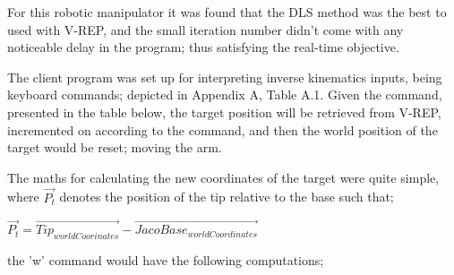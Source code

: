 \documentclass[12pt,openany,a4paper]{book}
\begin{document}
For this robotic manipulator it was found that the DLS method was the best to used with V-REP, and the small iteration number didn't come with any noticeable delay in the program; thus satisfying the real-time objective.

The client program was set up for interpreting inverse kinematics inputs, being keyboard commands; depicted in Appendix A, Table A.1. Given the command, presented in the table below, the target position will be retrieved from V-REP, incremented on according to the command, and then the world position of the target would be reset; moving the arm.

%

\vspace{\baselineskip}
The maths for calculating the new coordinates of the target were quite simple, where $\vec{P_t}$ denotes the position of the tip relative to the base such that;

\vspace{\baselineskip}
\begin{center}
$\vec{P_t} = \vec{Tip_{worldCoorinates}} - \vec{JacoBase_{worldCoordinates}}$
\end{center}

\vspace{\baselineskip}
the 'w' command would have the following computations;
\end{document}

